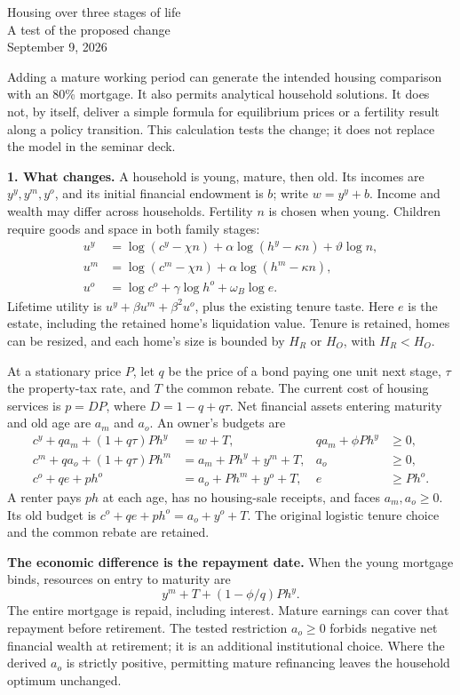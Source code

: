 \documentclass[11pt]{article}
\begin{document}
\begin{center}
{\Large Housing over three stages of life}\\[4pt]
{\large A test of the proposed change}\\[3pt]
September 9, 2026
\end{center}

Adding a mature working period can generate the intended housing comparison
with an 80\% mortgage. It also permits analytical household solutions. It
does not, by itself, deliver a simple formula for equilibrium prices or a
fertility result along a policy transition. This calculation tests the change;
it does not replace the model in the seminar deck.

\textbf{1. What changes.}
A household is young, mature, then old. Its incomes are $y^y,y^m,y^o$,
and its initial financial endowment is $b$; write $w=y^y+b$.
Income and wealth may differ across households. Fertility $n$ is chosen when
young. Children require goods and space in both family stages:
\begin{align*}
u^y&=\log(c^y-\chi n)+\alpha\log(h^y-\kappa n)+\vartheta\log n,\\
u^m&=\log(c^m-\chi n)+\alpha\log(h^m-\kappa n),\\
u^o&=\log c^o+\gamma\log h^o+\omega_B\log e.
\end{align*}
Lifetime utility is $u^y+\beta u^m+\beta^2u^o$, plus the existing tenure
taste. Here $e$ is the estate, including the retained home's liquidation value.
Tenure is retained, homes can be resized, and each home's size is bounded by
$H_R$ or $H_O$, with $H_R<H_O$.

At a stationary price $P$, let $q$ be the price of a bond paying one unit next
stage, $\tau$ the property-tax rate, and $T$ the common rebate. The current
cost of housing services is $p=DP$, where $D=1-q+q\tau$.
Net financial assets entering maturity and old age are $a_m$ and $a_o$.
An owner's budgets are
\begin{align*}
c^y+qa_m+(1+q\tau)Ph^y&=w+T,
&qa_m+\phi Ph^y&\ge0,\\
c^m+qa_o+(1+q\tau)Ph^m&=a_m+Ph^y+y^m+T,
&a_o&\ge0,\\
c^o+qe+ph^o&=a_o+Ph^m+y^o+T,
&e&\ge Ph^o.
\end{align*}
A renter pays $ph$ at each age, has no housing-sale receipts, and faces
$a_m,a_o\ge0$. Its old budget is $c^o+qe+ph^o=a_o+y^o+T$.
The original logistic tenure choice and the common rebate are retained.

\textbf{The economic difference is the repayment date.}
When the young mortgage binds, resources on entry to maturity are
\[
\boxed{\quad y^m+T+(1-\phi/q)Ph^y.\quad}
\]
The entire mortgage is repaid, including interest. Mature earnings can cover
that repayment before retirement. The tested restriction $a_o\ge0$ forbids
negative net financial wealth at retirement; it is an additional institutional
choice. Where the derived $a_o$ is strictly positive, permitting mature
refinancing leaves the household optimum unchanged.
\end{document}
